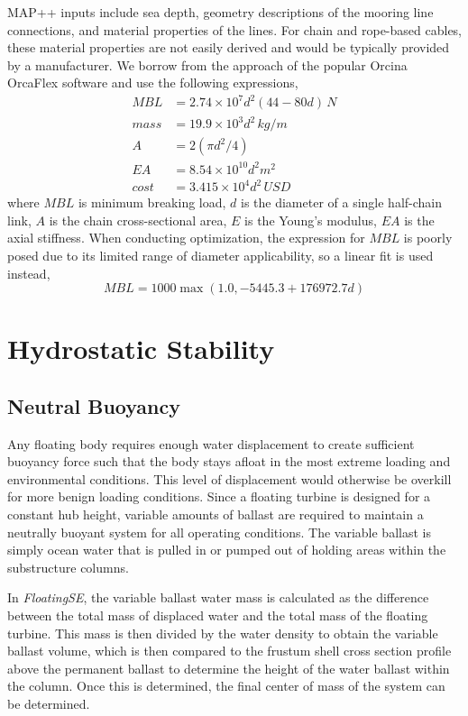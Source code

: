 MAP++ inputs include sea depth, geometry descriptions of the mooring
line connections, and material properties of the lines.  For chain and
rope-based cables, these material properties are not easily derived and
would be typically provided by a manufacturer.  We borrow from the
approach of the popular Orcina OrcaFlex software \citep{orca} and use
the following expressions,
\begin{align*}
MBL &= 2.74\times 10^7  d^2 \left(44 - 80d\right) \,\unit{N} \\
mass &= 19.9\times 10^3 d^2 \,\unit{kg/m}\\
A &= 2\left(\pi d^2 / 4 \right)\\
EA &= 8.54\times 10^{10} d^2\unit{m^2}\\
cost &= 3.415\times 10^4 d^2 \,\unit{USD}
\end{align*}
where $MBL$ is minimum breaking load, $d$ is the diameter of a single
half-chain link, $A$ is the chain cross-sectional area, $E$ is the
Young's modulus, $EA$ is the axial stiffness.  When conducting
optimization, the expression for $MBL$ is poorly posed due to its limited
range of diameter applicability, so a linear fit is used instead,
\[
MBL = 1000 \max\left(1.0, -5445.3 + 176972.7 d\right)
\]  

\section{Hydrostatic Stability}
\label{sec:static}
\subsection{Neutral Buoyancy}
Any floating body requires enough water displacement to create
sufficient buoyancy force such that the body stays afloat in the most
extreme loading and environmental conditions.  This level of
displacement would otherwise be overkill for more benign loading
conditions.  Since a floating turbine is designed for a constant hub
height, variable amounts of ballast are required to maintain a neutrally
buoyant system for all operating conditions.  The variable ballast is
simply ocean water that is pulled in or pumped out of holding areas
within the substructure columns.

In \textit{FloatingSE}, the variable ballast water mass is calculated as
the difference between the total mass of displaced water and the total
mass of the floating turbine.  This mass is then divided by the water
density to obtain the variable ballast volume, which is then compared to
the frustum shell cross section profile above the permanent ballast to
determine the height of the water ballast within the column.  Once this
is determined, the final center of mass of the system can be determined.

